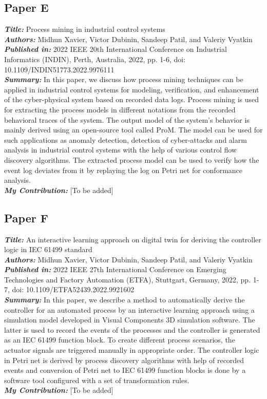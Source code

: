 \subsection{Paper E}
\textbf{\textit{Title:}} Process mining in industrial control systems\\
\textbf{\textit{Authors:}} Midhun Xavier, Victor Dubinin, Sandeep Patil, and Valeriy Vyatkin\\
\textbf{\textit{Published in:}} 2022 IEEE 20th International Conference on Industrial Informatics (INDIN), Perth, Australia, 2022, pp. 1-6, doi: 10.1109/INDIN51773.2022.9976111\\
\textbf{\textit{Summary:}} In this paper, we discuss how process mining techniques can be applied in industrial control systems for modeling, verification, and enhancement of the cyber-physical system based on recorded data logs. Process mining is used for extracting the process models in different notations from the recorded behavioral traces of the system. The output model of the system's behavior is mainly derived using an open-source tool called ProM. The model can be used for such applications as anomaly detection, detection of cyber-attacks and alarm analysis in industrial control systems with the help of various control flow discovery algorithms. The extracted process model can be used to verify how the event log deviates from it by replaying the log on Petri net for conformance analysis.\\
\textbf{\textit{My Contribution:}} [To be added]

\subsection{Paper F}
\textbf{\textit{Title:}} An interactive learning approach on digital twin for deriving the controller logic in IEC 61499 standard\\
\textbf{\textit{Authors:}} Midhun Xavier, Victor Dubinin, Sandeep Patil, and Valeriy Vyatkin\\
\textbf{\textit{Published in:}} 2022 IEEE 27th International Conference on Emerging Technologies and Factory Automation (ETFA), Stuttgart, Germany, 2022, pp. 1-7, doi: 10.1109/ETFA52439.2022.9921602\\
\textbf{\textit{Summary:}} In this paper, we describe a method to automatically derive the controller for an automated process by an interactive learning approach using a simulation model developed in Visual Components 3D simulation software. The latter is used to record the events of the processes and the controller is generated as an IEC 61499 function block. To create different process scenarios, the actuator signals are triggered manually in appropriate order. The controller logic in Petri net is derived by process discovery algorithms with help of recorded events and conversion of Petri net to IEC 61499 function blocks is done by a software tool configured with a set of transformation rules.\\
\textbf{\textit{My Contribution:}} [To be added]

